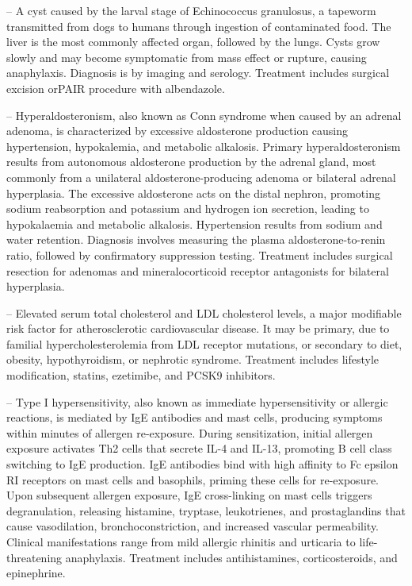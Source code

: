 -- A cyst caused by the larval stage of Echinococcus granulosus, a tapeworm transmitted from dogs to humans through ingestion of contaminated food. The liver is the most commonly affected organ, followed by the lungs. Cysts grow slowly and may become symptomatic from mass effect or rupture, causing anaphylaxis. Diagnosis is by imaging and serology. Treatment includes surgical excision orPAIR procedure with albendazole.

-- Hyperaldosteronism, also known as Conn syndrome when caused by an adrenal adenoma, is characterized by excessive aldosterone production causing hypertension, hypokalemia, and metabolic alkalosis. Primary hyperaldosteronism results from autonomous aldosterone production by the adrenal gland, most commonly from a unilateral aldosterone-producing adenoma or bilateral adrenal hyperplasia. The excessive aldosterone acts on the distal nephron, promoting sodium reabsorption and potassium and hydrogen ion secretion, leading to hypokalaemia and metabolic alkalosis. Hypertension results from sodium and water retention. Diagnosis involves measuring the plasma aldosterone-to-renin ratio, followed by confirmatory suppression testing. Treatment includes surgical resection for adenomas and mineralocorticoid receptor antagonists for bilateral hyperplasia.

-- Elevated serum total cholesterol and LDL cholesterol levels, a major modifiable risk factor for atherosclerotic cardiovascular disease. It may be primary, due to familial hypercholesterolemia from LDL receptor mutations, or secondary to diet, obesity, hypothyroidism, or nephrotic syndrome. Treatment includes lifestyle modification, statins, ezetimibe, and PCSK9 inhibitors.

-- Type I hypersensitivity, also known as immediate hypersensitivity or allergic reactions, is mediated by IgE antibodies and mast cells, producing symptoms within minutes of allergen re-exposure. During sensitization, initial allergen exposure activates Th2 cells that secrete IL-4 and IL-13, promoting B cell class switching to IgE production. IgE antibodies bind with high affinity to Fc epsilon RI receptors on mast cells and basophils, priming these cells for re-exposure. Upon subsequent allergen exposure, IgE cross-linking on mast cells triggers degranulation, releasing histamine, tryptase, leukotrienes, and prostaglandins that cause vasodilation, bronchoconstriction, and increased vascular permeability. Clinical manifestations range from mild allergic rhinitis and urticaria to life-threatening anaphylaxis. Treatment includes antihistamines, corticosteroids, and epinephrine.

